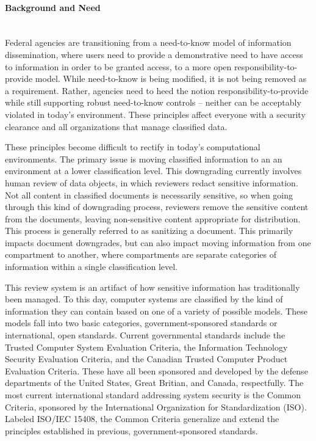 \documentclass{sbir}
\begin{document}
\paragraph{Background and Need}~\\
Federal agencies are transitioning from a need-to-know model of information dissemination, where users need to provide a demonstrative need to have access to information in order to be granted access, to a more open responsibility-to-provide model. While need-to-know is being modified, it is not being removed as a requirement. Rather, agencies need to heed the notion responsibility-to-provide  while still supporting robust need-to-know controls -- neither can be acceptably violated in today's environment. These principles affect everyone with a security clearance and all organizations that manage classified data.


These principles become difficult to rectify in today's computational environments. The primary issue is moving classified information to an an environment at a lower classification level. This downgrading currently involves human review of data objects, in which reviewers redact sensitive information. Not all content in classified documents is necessarily sensitive, so when going through this kind of downgrading process, reviewers remove the sensitive content from the documents, leaving non-sensitive content appropriate for distribution. This process is generally referred to as sanitizing a document. This primarily impacts document downgrades, but can also impact moving information from one compartment to another, where compartments are separate categories of information within a single classification level.

This review system is an artifact of how sensitive information has traditionally been managed. To this day, computer systems are classified by the kind of information they can contain based on one of a variety of possible models. These models fall into two basic categories, government-sponsored standards or international, open standards. Current governmental standards include the Trusted Computer System Evaluation Criteria, the Information Technology Security Evaluation Criteria, and the Canadian Trusted Computer Product Evaluation Criteria. These have all been sponsored and developed by the defense departments of the United States, Great Britian, and Canada, respectfully. The most current international standard addressing system security is the Common Criteria, sponsored by the International Organization for Standardization (ISO). Labeled ISO/IEC 15408, the Common Criteria generalize and extend the principles established in previous, government-sponsored standards.
\end{document}
